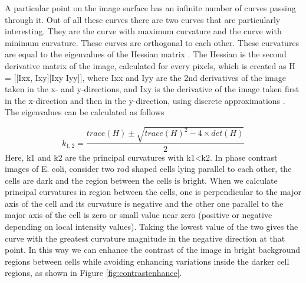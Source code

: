 \documentclass[journal]{IEEEtran}
\begin{document}
A particular point on the image surface has an infinite number of curves passing through it. Out of all these curves there are two curves that are particularly interesting. They are the curve with maximum curvature and the curve with minimum curvature. These curves are orthogonal to each other. These curvatures are equal to the eigenvalues of the Hessian matrix \cite {thorpeelementary1979}. The Hessian is the second derivative matrix of the image, calculated for every pixels, which is created as H = [[Ixx, Ixy][Ixy Iyy]], where Ixx and Iyy are the 2nd derivatives of the image taken in the x- and y-directions, and Ixy is the derivative of the image taken first in the x-direction and then in the y-direction, using discrete approximations \cite{woodfordnumerical2012}. The eigenvalues can be calculated as follows 


\begin{equation}
k_{1,2} = \frac{trace(H)\pm \sqrt{trace(H)^2 -4\times det(H)} }{2}
\end{equation}
Here, k1 and k2 are the principal curvatures with k1<k2.  In phase contrast images of E. coli, consider two rod shaped cells lying parallel to each other, the cells are dark and the region between the cells is bright. When we calculate principal curvatures in region between the cells, one is perpendicular to the major axis of the cell and its curvature is negative and the other one parallel to the major axis of the cell is zero or small value near zero (positive or negative depending on local intensity values). Taking the lowest value of the two gives the curve with the greatest curvature magnitude in the negative direction at that point. In this way we can enhance the contrast of the image in bright background regions between cells while avoiding enhancing variations inside the darker cell regions, as shown in Figure \ref{fig:contrastenhance}. 
\end{document}
